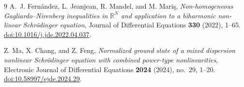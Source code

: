 \documentclass[11pt,letterpaper]{article}
\numberwithin{equation}{section}
\newcommand{\RR}{\mathbb R}
\begin{document}
\begin{thebibliography}{9}
A.~J. Fern\'andez, L. Jeanjean, R. Mandel, and M. Mari\c{s},
\emph{Non-homogeneous Gagliardo--Nirenberg inequalities in $\RR^N$ and application to a biharmonic non-linear Schr\"odinger equation},
Journal of Differential Equations \textbf{330} (2022), 1--65.
\href{https://doi.org/10.1016/j.jde.2022.04.037}{doi:10.1016/j.jde.2022.04.037}.

Z. Ma, X. Chang, and Z. Feng,
\emph{Normalized ground state of a mixed dispersion nonlinear Schr\"odinger equation with combined power-type nonlinearities},
Electronic Journal of Differential Equations \textbf{2024} (2024), no.~29, 1--20.
\href{https://doi.org/10.58997/ejde.2024.29}{doi:10.58997/ejde.2024.29}.
\end{thebibliography}
\end{document}
